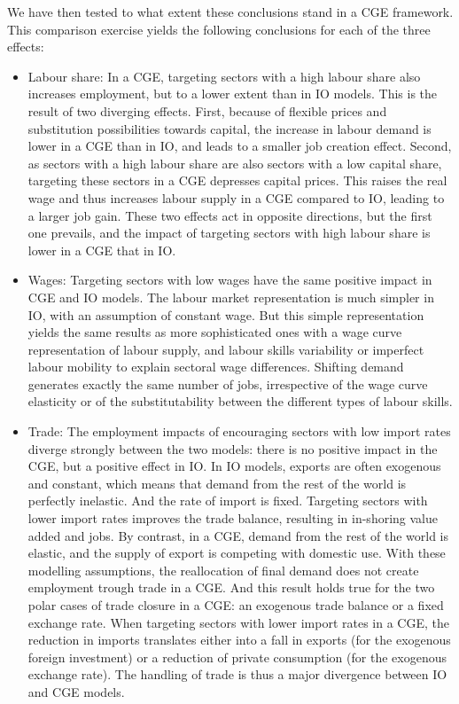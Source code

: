 We have then tested to what extent these conclusions stand in a CGE framework. 
This comparison exercise yields the following conclusions for each of the three effects:
\begin{itemize}
	\item Labour share: In a CGE, targeting sectors with a high labour share also increases employment, but to a lower extent than in IO models. This is the result of two diverging effects. First, because of flexible prices and substitution possibilities towards capital, the increase in labour demand is lower in a CGE than in IO, and leads to a smaller job creation effect. Second, as sectors with a high labour share are also sectors with a low capital share, targeting these sectors in a CGE depresses capital prices. This raises the real wage and thus increases labour supply in a CGE compared to IO, leading to a larger job gain. These two effects act in opposite directions, but the first one prevails, and the impact of targeting sectors with high labour share is lower in a CGE that in IO.
	
	\item Wages: Targeting sectors with low wages have the same positive impact in CGE and IO models. The labour market representation is much simpler in IO, with an assumption of constant wage. But this simple representation yields the same results as more sophisticated ones with a wage curve representation of labour supply, and labour skills variability or imperfect labour mobility to explain sectoral wage differences. Shifting demand generates exactly the same number of jobs, irrespective of the wage curve elasticity or of the substitutability between the different types of labour skills.
	
	\item Trade: The employment impacts of encouraging sectors with low import rates diverge strongly between the two models: there is no positive impact in the CGE, but a positive effect in IO. 
	In IO models, exports are often exogenous and constant, which means that demand from the rest of the world is perfectly inelastic. And the rate of import is fixed. Targeting sectors with lower import rates improves the trade balance, resulting in in-shoring value added and jobs. 
	By contrast, in a CGE, demand from the rest of the world is elastic, and the supply of export is competing with domestic use. With these modelling assumptions, the reallocation of final demand does not create employment trough trade in a CGE. And this result holds true for the two polar cases of trade closure in a CGE: an exogenous trade balance or a fixed exchange rate. When targeting sectors with lower import rates in a CGE, the reduction in imports translates either into a fall in exports (for the exogenous foreign investment) or a reduction of private consumption (for the exogenous exchange rate).
	The handling of trade is thus a major divergence between IO and CGE models.
\end{itemize}

